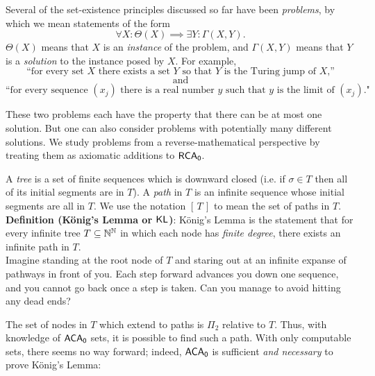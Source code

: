 \documentclass{amsart}
\begin{document}
	Several of the set-existence principles discussed so far have been \textit{problems}, by which we mean statements of the form
	$$
	\forall X: \Theta(X) \implies \exists Y: \Gamma(X,Y).
	$$
	$\Theta(X)$ means that $X$ is an \textit{instance} of the problem, and $\Gamma(X,Y)$ means that $Y$ is a \textit{solution} to the instance posed by $X$. For example, 
	$$\text{``for every set $X$ there exists a set $Y$ so that $Y$ is the Turing jump of $X$,''}$$ 
	$$\text{and}$$ 
	$$\text{``for every sequence $(x_j)$ there is a real number $y$ such that $y$ is the limit of $(x_j)$."}$$
	\begin{samepage}
		These two problems each have the property that there can be at most one solution. But one can also consider problems with potentially many different solutions. We study problems from a reverse-mathematical perspective by treating them as axiomatic additions to $\operatorname{\sf{RCA_0}}$.
	\end{samepage}
	
	A \textit{tree} is a set of finite sequences which is downward closed (i.e. if $\sigma\in T$ then all of its initial segments are in $T$). A \textit{path} in $T$ is an infinite sequence whose initial segments are all in $T$. We use the notation $[\,T\,]$ to mean the set of paths in $T$.\\
	
	\noindent \textbf{Definition (K\"onig's Lemma or $\operatorname{\sf{KL}}$)}: K\"onig's Lemma is the statement that for every infinite tree $T\subseteq \mathbb{N}^{\mathbb{N}}$ in which each node has \textit{finite degree}, there exists an infinite path in $T$.\\
	
	Imagine standing at the root node of $T$ and staring out at an infinite expanse of pathways in front of you. Each step forward advances you down one sequence, and you cannot go back once a step is taken. Can you manage to avoid hitting any dead ends? 
	
	The set of nodes in $T$ which extend to paths is $\Pi_2$ relative to $T$. Thus, with knowledge of $\operatorname{\sf{ACA_0}}$ sets, it is possible to find such a path. With only computable sets, there seems no way forward; indeed, $\operatorname{\sf{ACA_0}}$ is sufficient \textit{and necessary} to prove K\"onig's Lemma:\\
	
	
\end{document}
